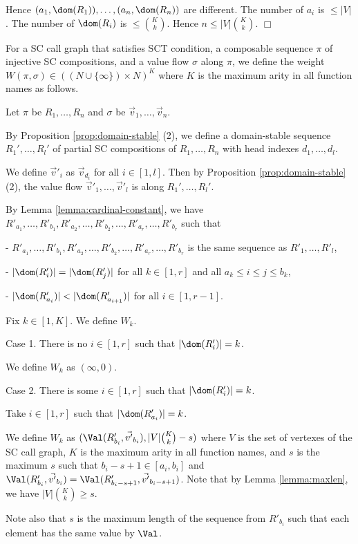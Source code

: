Hence $(a_1,\dom(R_1)),\ldots, (a_n,\dom(R_n))$ are different.
The number of $a_i$ is $\le |V|$.
The number of $\dom(R_i)$ is $\le {K \choose k}$.
Hence $n \le |V|{K \choose k}$.
$\Box$

\begin{Def}[Weight]\label{def:weight}\rm
For a SC call graph that satisfies SCT condition,
a composable sequence $\pi$ of injective SC compositions, and 
a value flow $\sigma$ along $\pi$,
we define the weight $W(\pi, \sigma) \in ((N\cup\{\infty\}) \times N)^{K}$ 
where $K$ is the maximum arity in all function names
as follows.

Let $\pi$ be $R_1,\ldots, R_n$ and
$\sigma$ be $\Vec v_1,\ldots,\Vec v_n$.

By Proposition \ref{prop:domain-stable} (2), we define
a domain-stable sequence $R_1',\ldots,R_l'$ 
of partial SC compositions of $R_1,\ldots, R_n$ with 
head indexes $d_1,\ldots,d_l$.

We define $\Vec v'_i$ as $\Vec v_{d_i}$ for all $i \in [1,l]$.
Then by Proposition \ref{prop:domain-stable} (2), 
the value flow $\Vec v'_1,\ldots,\Vec v'_l$ is
along $R_1',\ldots,R_l'$.

By Lemma \ref{lemma:cardinal-constant},
we have
$R'_{a_1},\ldots,R'_{b_1},R'_{a_2},\ldots,R'_{b_2},\ldots, 
R'_{a_r},\ldots,R'_{b_r}$ such that

- $R'_{a_1},\ldots,R'_{b_1},R'_{a_2},\ldots,R'_{b_2},\ldots,
R'_{a_r},\ldots,R'_{b_r}$
is the same sequence as $R'_1,\ldots,R'_l$,

- $|\dom(R'_i)| = |\dom(R'_j)|$ for all $k \in [1,r]$ and
all $a_k \le i \le j \le b_k$,

- $|\dom(R'_{a_i})| < |\dom(R'_{a_{i+1}})|$ for all $i \in [1,r-1]$.

Fix $k \in [1,K]$. We define $W_k$.

Case 1. There is no $i \in [1,r]$ such that $|\dom(R'_i)| = k$.

We define $W_k$ as $(\infty,0)$.

Case 2. There is some $i \in [1,r]$ such that $|\dom(R'_i)| = k$.

Take $i \in [1,r]$ such that $|\dom(R'_{a_i})| = k$.

We define $W_k$ as $(\Val(R'_{b_i}, \Vec {v'}_{b_i}),|V|{K \choose k}-s)$
where $V$ is the set of vertexes of the SC call graph,
$K$ is the maximum arity in all function names,
and $s$ is the maximum $s$ such that
$b_i-s+1 \in [a_i,b_i]$ and
$\Val(R'_{b_i}, \Vec {v'}_{b_i}) = \Val(R'_{b_i-s+1}, \Vec {v'}_{b_i-s+1})$.
Note that by Lemma \ref{lemma:maxlen}, we have $|V|{K \choose k} \ge s$.

Note also that $s$ is the maximum length of the sequence from $R'_{b_i}$
such that each element has the same value by $\Val$.
\end{Def}


